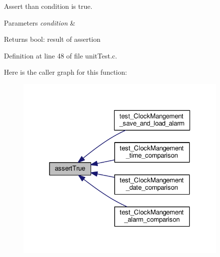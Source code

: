 Assert than condition is true. 


\begin{DoxyParams}{Parameters}
{\em condition} & \\
\hline
\end{DoxyParams}
\begin{DoxyReturn}{Returns}
bool\+: result of assertion 
\end{DoxyReturn}


Definition at line 48 of file unit\+Test.\+c.



Here is the caller graph for this function\+:\nopagebreak
\begin{figure}[H]
\begin{center}
\leavevmode
\includegraphics[width=295pt]{d5/d7f/group__unit_test___assert_gaa97328e4e17a7361f0bd831d96d55990_icgraph}
\end{center}
\end{figure}



